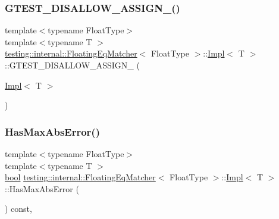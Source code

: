 \subsubsection{\texorpdfstring{G\+T\+E\+S\+T\+\_\+\+D\+I\+S\+A\+L\+L\+O\+W\+\_\+\+A\+S\+S\+I\+G\+N\+\_\+()}{GTEST\_DISALLOW\_ASSIGN\_()}}
{\footnotesize\ttfamily template$<$typename Float\+Type$>$ \\
template$<$typename T $>$ \\
\hyperlink{classtesting_1_1internal_1_1FloatingEqMatcher}{testing\+::internal\+::\+Floating\+Eq\+Matcher}$<$ Float\+Type $>$\+::\hyperlink{classtesting_1_1internal_1_1FloatingEqMatcher_1_1Impl}{Impl}$<$ T $>$\+::G\+T\+E\+S\+T\+\_\+\+D\+I\+S\+A\+L\+L\+O\+W\+\_\+\+A\+S\+S\+I\+G\+N\+\_\+ (\begin{DoxyParamCaption}\item[{\hyperlink{classtesting_1_1internal_1_1FloatingEqMatcher_1_1Impl}{Impl}$<$ T $>$}]{ }\end{DoxyParamCaption})\hspace{0.3cm}{\ttfamily [private]}}

\mbox{\label{classtesting_1_1internal_1_1FloatingEqMatcher_1_1Impl_a3e3539f59004154b8af47a87a83a2d59}} 
\subsubsection{\texorpdfstring{Has\+Max\+Abs\+Error()}{HasMaxAbsError()}}
{\footnotesize\ttfamily template$<$typename Float\+Type$>$ \\
template$<$typename T $>$ \\
\hyperlink{classbool}{bool} \hyperlink{classtesting_1_1internal_1_1FloatingEqMatcher}{testing\+::internal\+::\+Floating\+Eq\+Matcher}$<$ Float\+Type $>$\+::\hyperlink{classtesting_1_1internal_1_1FloatingEqMatcher_1_1Impl}{Impl}$<$ T $>$\+::Has\+Max\+Abs\+Error (\begin{DoxyParamCaption}{ }\end{DoxyParamCaption}) const\hspace{0.3cm}{\ttfamily [inline]}, {\ttfamily [private]}}



